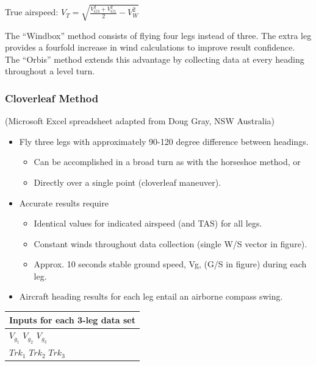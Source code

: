 \documentclass[
]{book}
\providecommand{\tightlist}{%
  \setlength{\itemsep}{0pt}\setlength{\parskip}{0pt}}
\begin{document}
True airspeed: \(V_T = \sqrt{\frac{V_{G3}^2 + V_{G1}^2}{2} - V_W^2}\)

The ``Windbox'' method consists of flying four legs instead of three. The extra leg provides a fourfold increase in wind calculations to improve result confidence. The ``Orbis'' method extends this advantage by collecting data at every heading throughout a level turn.

\hypertarget{cloverleaf-method}{%
\subsubsection*{Cloverleaf Method}\label{cloverleaf-method}}

(Microsoft Excel spreadsheet adapted from Doug Gray, NSW Australia)

\begin{itemize}
\tightlist
\item
  Fly three legs with approximately 90-120 degree difference between headings.

  \begin{itemize}
  \tightlist
  \item
    Can be accomplished in a broad turn as with the horseshoe method, or
  \item
    Directly over a single point (cloverleaf maneuver).
  \end{itemize}
\item
  Accurate results require

  \begin{itemize}
  \tightlist
  \item
    Identical values for indicated airspeed (and TAS) for all legs.
  \item
    Constant winds throughout data collection (single W/S vector in figure).
  \item
    Approx. 10 seconds stable ground speed, Vg, (G/S in figure) during each leg.
  \end{itemize}
\item
  Aircraft heading results for each leg entail an airborne compass swing.
\end{itemize}

\begin{longtable}[]{@{}l@{}}
\toprule
Inputs for each 3-leg data set\tabularnewline
\midrule
\endhead
\(V_{g_1}\) \(V_{g_2}\) \(V_{g_3}\)\tabularnewline
\(Trk_{1}\) \(Trk_{2}\) \(Trk_{3}\)\tabularnewline
\bottomrule
\end{longtable}
\end{document}

